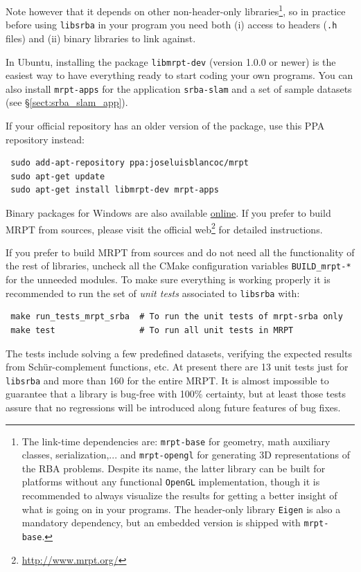 \documentclass[a4paper,11pt]{article}
\begin{document}
Note however that it depends on other non-header-only libraries\footnote{The link-time dependencies are: \texttt{mrpt-base} 
for geometry, math auxiliary classes, serialization,... and \texttt{mrpt-opengl} for generating 3D representations of 
the RBA problems. Despite its name, the latter library can be built for platforms without any 
functional \texttt{OpenGL} implementation, though it is recommended to always visualize the results for getting a better 
insight of what is going on in your programs. The header-only library \texttt{Eigen} \cite{eigenweb} is also a mandatory dependency, but 
an embedded version is shipped with \texttt{mrpt-base}.}, 
so in practice before using \texttt{libsrba} in your program you need
both (i) access to headers (\texttt{.h} files) and (ii) binary libraries to link against. 

In Ubuntu, installing the package \texttt{libmrpt-dev} (version 1.0.0 or newer) is the easiest way to have 
everything ready to start coding your own programs. You can also install \texttt{mrpt-apps} for the application \texttt{srba-slam} 
and a set of sample datasets (see \S\ref{sect:srba_slam_app}).

If your official repository has an older version of the package, use this PPA repository instead:

\begin{lstlisting}
 sudo add-apt-repository ppa:joseluisblancoc/mrpt
 sudo apt-get update
 sudo apt-get install libmrpt-dev mrpt-apps
\end{lstlisting}

Binary packages for Windows are also available \href{http://www.mrpt.org/download}{online}.
If you prefer to build MRPT from sources, please visit the official web\footnote{\href{http://www.mrpt.org/}{http://www.mrpt.org/}} 
for detailed instructions.

If you prefer to build MRPT from sources and do not need all the functionality of the rest of libraries, 
uncheck all the CMake configuration variables \texttt{BUILD\_mrpt-*} for the unneeded modules. 
To make sure everything is working properly it is recommended to run the set of \emph{unit tests} associated 
to \texttt{libsrba} with: 

\begin{lstlisting}
 make run_tests_mrpt_srba  # To run the unit tests of mrpt-srba only
 make test                 # To run all unit tests in MRPT
\end{lstlisting}

The tests include solving a few predefined datasets, verifying the expected results from 
Sch\"ur-complement functions, etc. At present there are 13 unit tests just for \texttt{libsrba}
and more than 160 for the entire MRPT. 
It is almost impossible to guarantee that a library is bug-free with 100\% certainty, 
but at least those tests assure that no regressions will be introduced along future features of bug fixes.
\end{document}
